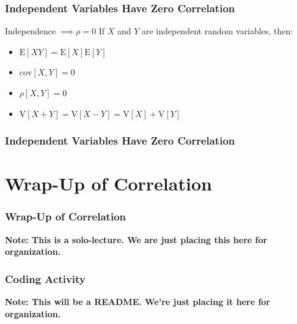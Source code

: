 \documentclass[12pt, block=fill]{beamer}
\newcommand{\E}{\text{E}}
\newcommand{\V}{\text{V}}
\newcommand{\cov}{\text{cov}}
\begin{document}
\begin{frame}
  \frametitle{Independent Variables Have Zero Correlation}
  \begin{block}{Independence $\implies \rho = 0$ }
    If $X$ and $Y$ are independent random variables, then: 
    \begin{itemize} 
    \item $\E[XY] = \E[X]\E[Y]$
    \item $\cov[X,Y] = 0$
    \item $\rho[X,Y] = 0$
    \item $\V[X + Y] = \V[X-Y] = \V[X] + \V[Y]$ 
    \end{itemize} 
  \end{block}
\end{frame}

\begin{frame}
  \frametitle{Independent Variables Have Zero Correlation}
  
\end{frame} 

\section{Wrap-Up of Correlation}

\begin{frame}
  \frametitle{Wrap-Up of Correlation} 
  \textbf{Note: This is a solo-lecture. We are just placing this here
    for organization.} 

\end{frame} 

\begin{frame}
  \frametitle{Coding Activity}
  \textbf{Note: This will be a README. We're just placing it here for
    organization.}    
\end{frame}
\end{document}
